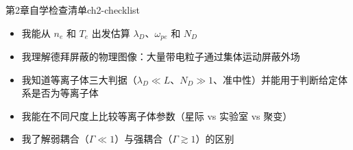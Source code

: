 \begin{checklistbox}{第2章自学检查清单}{ch2-checklist}
\begin{itemize}[leftmargin=*,label=$\square$]
\item 我能从 $n_e$ 和 $T_e$ 出发估算 $\lambda_D$、$\omega_{pe}$ 和 $N_D$
\item 我理解德拜屏蔽的物理图像：大量带电粒子通过集体运动屏蔽外场
\item 我知道等离子体三大判据（$\lambda_D\ll L$、$N_D\gg 1$、准中性）并能用于判断给定体系是否为等离子体
\item 我能在不同尺度上比较等离子体参数（星际 vs 实验室 vs 聚变）
\item 我了解弱耦合（$\Gamma\ll 1$）与强耦合（$\Gamma\gtrsim 1$）的区别
\end{itemize}
\end{checklistbox}

\endinput

